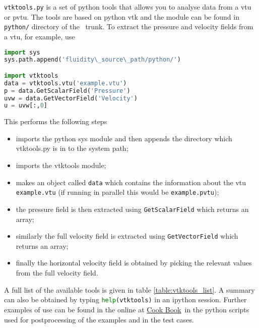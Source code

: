 \lstinline[language = bash]+vtktools.py+ is a set of python tools that allows you to analyse data from a vtu or pvtu. The tools are based on python vtk and the module can be found in \lstinline[language = bash]+python/+ directory of the \fluidity\ trunk. To extract the pressure and velocity fields from a vtu, for example, use
\begin{lstlisting}[language = Python]
import sys
sys.path.append('fluidity\_source\_path/python/')

import vtktools
data = vtktools.vtu('example.vtu')
p = data.GetScalarField('Pressure')
uvw = data.GetVectorField('Velocity')
u = uvw[:,0]
\end{lstlisting}
This performs the following steps
\begin{itemize}
\item imports the python sys module and then appends the directory which vtktools.py is in to the system path;
\item imports the vtktools module;
\item makes an object called \lstinline[language=Python]+data+ which contains the information about the vtu \lstinline[language=Python]+example.vtu+ (if running in parallel this would be \lstinline[language=Python]+example.pvtu+);
\item the pressure field is then extracted using \lstinline[language=Python]+GetScalarField+ which returns an array;
\item similarly the full velocity field is extracted using \lstinline[language=Python]+GetVectorField+ which returns an array;
\item finally the horizontal velocity field is obtained by picking the relevant values from the full velocity field.
\end{itemize}
A full list of the available tools is given in table \ref{table:vtktools_list}. A summary can also be obtained by typing \lstinline[language=Python]+help(vtktools)+ in an ipython session.  Further examples of use can be found in the online at \href{http://amcg.ese.ic.ac.uk/index.php?title=Cook_Book}{Cook Book}\, in the python scripts used for postprocessing of the examples and in the test cases.

